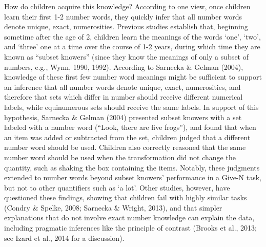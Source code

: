 \documentclass[10pt, letterpaper]{article}
\begin{document}
How do children acquire this knowledge? According to one view, once
children learn their first 1-2 number words, they quickly infer that all
number words denote unique, exact, numerosities. Previous studies
establish that, beginning sometime after the age of 2, children learn
the meanings of the words `one', `two', and `three' one at a time over
the course of 1-2 years, during which time they are known as ``subset
knowers'' (since they know the meanings of only a subset of numbers,
e.g., Wynn, 1990, 1992). According to Sarnecka \& Gelman (2004),
knowledge of these first few number word meanings might be sufficient to
support an inference that all number words denote unique, exact,
numerosities, and therefore that sets which differ in number should
receive different numerical labels, while equinumerous sets should
receive the same labels. In support of this hypothesis, Sarnecka \&
Gelman (2004) presented subset knowers with a set labeled with a number
word (``Look, there are five frogs''), and found that when an item was
added or subtracted from the set, children judged that a different
number word should be used. Children also correctly reasoned that the
same number word should be used when the transformation did not change
the quantity, such as shaking the box containing the items. Notably,
these judgments extended to number words beyond subset knowers'
performance in a Give-N task, but not to other quantifiers such as `a
lot'. Other studies, however, have questioned these findings, showing
that children fail with highly similar tasks (Condry \& Spelke, 2008;
Sarnecka \& Wright, 2013), and that simpler explanations that do not
involve exact number knowledge can explain the data, including pragmatic
inferences like the principle of contrast (Brooks et al., 2013; see
Izard et al., 2014 for a discussion).
\end{document}
